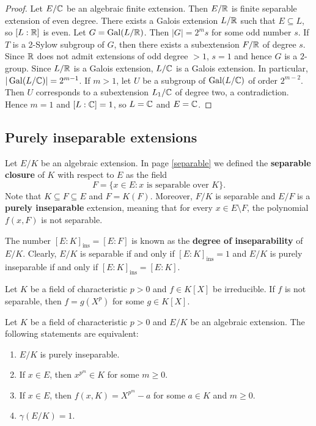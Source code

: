 \begin{proof}
    Let $E/\mathbb{C}$ be an algebraic finite extension. Then $E/\mathbb{R}$ 
    is finite separable extension of even degree. There exists a Galois
    extension 
    $L/\mathbb{R}$ such that $E\subseteq L$, so $[L:\mathbb{R}]$ is even. Let $G=\operatorname{Gal}(L/\mathbb{R})$. 
    Then $|G|=2^ms$ for some odd number $s$. If $T$ is a 2-Sylow subgroup
    of $G$, 
    then there exists a subextension $F/\mathbb{R}$ of degree $s$. Since 
    $\mathbb{R}$ does not admit extensions of odd degree $>1$, $s=1$ and
    hence $G$ is a $2$-group. Since 
    $L/\mathbb{R}$ is a Galois extension, $L/\mathbb{C}$ is a Galois extension. 
    In particular, $|\operatorname{Gal}(L/\mathbb{C})|=2^{m-1}$. If $m>1$, 
    let $U$ be a subgroup of $\operatorname{Gal}(L/\mathbb{C})$ of order $2^{m-2}$. Then $U$ corresponds 
    to a subextension $L_1/\mathbb{C}$ of degree two, a contradiction. Hence $m=1$ 
    and $[L:\mathbb{C}]=1$, so $L=\mathbb{C}$ and $E=\mathbb{C}$. 
\end{proof}

\subsection{Purely inseparable extensions}

Let $E/K$ be an algebraic extension. 
In page \ref{separable} we defined the 
\textbf{separable closure} of $K$ with respect to $E$ as 
the field 
\[
    F=\{x\in E:x\text{ is separable over }K\}.
\]
Note that $K\subseteq F\subseteq E$ 
and $F=K(F)$. Moreover, 
$F/K$ is separable and 
$E/F$ is a \textbf{purely inseparable} extension, meaning that
for every $x\in E\setminus F$, the polynomial $f(x,F)$ is not separable. 

The number $[E:K]_{\operatorname{ins}}=[E:F]$ is known as the \textbf{degree of inseparability} of $E/K$. 
Clearly, $E/K$ is separable if and only if $[E:K]_{\operatorname{ins}}=1$ and 
$E/K$ is purely inseparable if and only if $[E:K]_{\operatorname{ins}}=[E:K]$. 

\begin{exercise}
    \label{xca:separable_charp}
    Let $K$ be a field of characteristic $p>0$ and $f\in K[X]$ be irreducible.
    If $f$ is not separable, then $f=g(X^p)$ for some $g\in K[X]$. 
\end{exercise}



\begin{proposition}
Let $K$ be a field of characteristic $p>0$ and
$E/K$ be an algebraic extension. The following statements are equivalent:
\begin{enumerate}
    \item $E/K$ is purely inseparable.
    \item If $x\in E$, then $x^{p^m}\in K$ for some $m\geq0$.
    \item If $x\in E$, then $f(x,K)=X^{p^m}-a$ for some $a\in K$ and $m\geq0$. 
    \item $\gamma(E/K)=1$. 
\end{enumerate}
\end{proposition}

